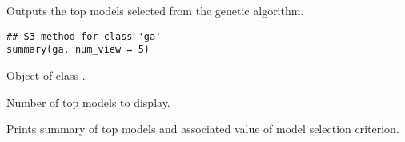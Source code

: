 %
\begin{Description}\relax
Outputs the top models selected from the genetic algorithm.
\end{Description}
%
\begin{Usage}
\begin{verbatim}
## S3 method for class 'ga'
summary(ga, num_view = 5)
\end{verbatim}
\end{Usage}
%
\begin{Arguments}
\begin{ldescription}
\item[\code{ga}] Object of class .

\item[\code{num\_view}] Number of top models to display.
\end{ldescription}
\end{Arguments}
%
\begin{Value}
Prints summary of top models and associated value of
model selection criterion.
\end{Value}
